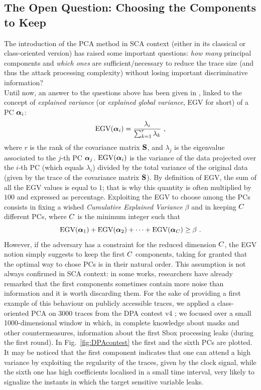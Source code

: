 \subsection{The Open Question: Choosing the Components to Keep}\label{sec:ELV}
The introduction of the PCA method in SCA context (either in its classical or class-oriented version)  has raised some important questions: \textit{how many} principal components and \textit{which ones} are sufficient/necessary to reduce the trace size (and thus the attack processing complexity) without losing important discriminative information?\\

Until now, an answer to the questions above has been given in \cite{choudary2014efficient}, linked to the concept of {\em explained variance} (or {\em explained global variance}, EGV for short) of a PC $\boldsymbol\alpha_i$:
\begin{equation}\label{eq:EGV}
\mathrm{EGV}(\boldsymbol\alpha_i) =  \frac{\lambda_i}{\sum_{k=1}^r\lambda_k} \mbox{ ,}
\end{equation}
where $r$ is the rank of the covariance matrix $\textbf{S}$, and $\lambda_j$ is the eigenvalue associated to the $j$-th PC $\boldsymbol\alpha_j$. $\mathrm{EGV}(\boldsymbol\alpha_i)$ is the variance of the data projected over the $i$-th PC (which equals $\lambda_i$) divided by the total variance of the original data (given by the trace of the covariance matrix $\textbf{S}$). By definition of EGV, the sum of all the EGV values is equal to $1$; that is why this quantity is often multiplied by $100$ and expressed as percentage.
Exploiting the EGV to choose among the PCs consists in fixing a wished {\em Cumulative Explained Variance} $\beta$ and in keeping $C$ different PCs, where $C$ is the minimum integer such that
\begin{equation}
\mbox{EGV}(\boldsymbol\alpha_1) +\mbox{EGV}(\boldsymbol\alpha_2) + \dots +\mbox{EGV}(\boldsymbol\alpha_C) \geq \beta \mbox{ .}
\end{equation}
However, if the adversary has a constraint for the reduced dimension $C$, the EGV notion simply suggests to keep the first $C$ components, taking for granted that the optimal way to chose PCs is in their natural order. This assumption is not always confirmed in SCA context: in some works, researchers have already remarked that the first components sometimes contain more noise than information \cite{Batina2012,specht} and it is worth discarding them. For the sake of providing a first example of this behaviour on publicly accessible traces, we applied a class-oriented PCA on 3000 traces from the DPA contest v4 \cite{DPAcontest}; we focused over a small 1000-dimensional window in which, in complete knowledge about masks and other countermeasures, information about the first Sbox processing leaks (during the first round). In Fig.~\ref{fig:DPAcontest} the first and the sixth PCs are plotted. It may be noticed that the first component indicates that one can attend a high variance by exploiting the regularity of the traces, given by the clock signal, while the sixth one has high coefficients localised in a small time interval, very likely to signalize the instants in which the target sensitive variable leaks.

